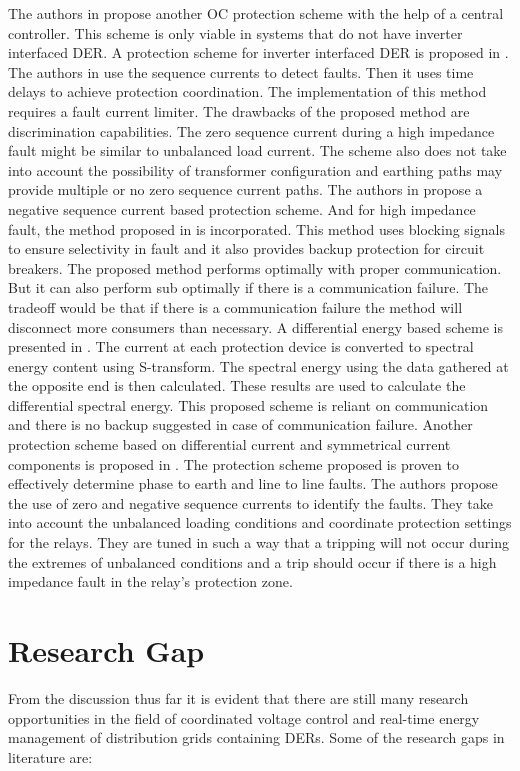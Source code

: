 The authors in \cite{PR140} propose another OC protection scheme with the help of a central controller. This scheme is only viable in systems that do not have inverter interfaced DER.
A protection scheme for inverter interfaced DER is proposed in \cite{PR142}. The authors in \cite{PR142} use the sequence currents to detect faults. Then it uses time delays to achieve protection coordination. The implementation of this method requires a fault current limiter. The drawbacks of the proposed method are discrimination capabilities. The zero sequence current during a high impedance fault might be similar to unbalanced load current. The scheme also does not take into account the possibility of transformer configuration and earthing paths may provide multiple or no zero sequence current paths.
The authors in \cite{PR143} propose a negative sequence current based protection scheme. And for high impedance fault, the method proposed in \cite{PR144} is incorporated. This method uses blocking signals to ensure selectivity in fault and it also provides backup protection for circuit breakers. The proposed method performs optimally with proper communication. But it can also perform sub optimally if there is a communication failure. The tradeoff would be that if there is a communication failure the method will disconnect more consumers than necessary. 
A differential energy based scheme is presented in  \cite{PR145}. The current at each protection device is converted to spectral energy content using S-transform. The spectral energy using the data gathered at the opposite end is then calculated. These results are used to calculate the differential spectral energy. This proposed scheme is reliant on communication and there is no backup suggested in case of communication failure. 
Another protection scheme based on differential current and symmetrical current components is proposed in \cite{PR146}. The protection scheme proposed is proven to effectively determine phase to earth and line to line faults. The authors propose the use of zero and negative sequence currents to identify the faults. They take into account the unbalanced loading conditions and coordinate protection settings for the relays. They are tuned in such a way that a tripping will not occur during the extremes of unbalanced conditions and a trip should occur if there is a high impedance fault in the relay’s protection zone.




\section{Research Gap}
From the discussion thus far it is evident that there are still many research opportunities in the field of coordinated voltage control and real-time energy management of distribution grids containing DERs. Some of the research gaps in literature are:

